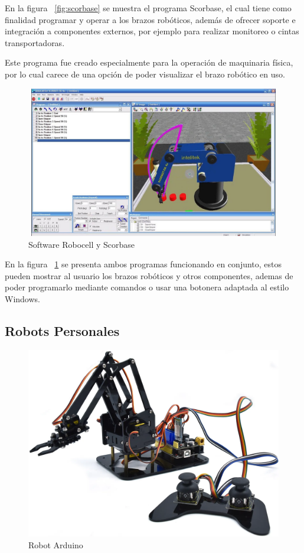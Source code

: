 En la figura ~\ref{fig:scorbase} se muestra el programa Scorbase, el cual tiene como finalidad programar y operar a los brazos robóticos, además de ofrecer soporte e integración a componentes externos, por ejemplo para realizar monitoreo o cintas transportadoras.

Este programa fue creado especialmente para la operación de maquinaria física, por lo cual carece de una opción de poder visualizar el brazo robótico en uso.

\begin{figure}[ht]
\centering
\includegraphics[width=13cm, height=6.6cm]{figures/robocell scorbase.jpg}
\caption{Software Robocell y Scorbase}
\label{fig:robobase}
\end{figure}

En la figura ~\ref{fig:robobase} se presenta ambos programas funcionando en conjunto, estos pueden mostrar al usuario los brazos robóticos y otros componentes, ademas de poder programarlo mediante comandos o usar una botonera adaptada al estilo Windows.

\clearpage

\subsection{Robots Personales}

\begin{figure}[ht]
\centering
\includegraphics[width=13cm]{figures/Brazo robotico.png}
\caption{Robot Arduino}
\label{fig:robotarduino}
\end{figure}

